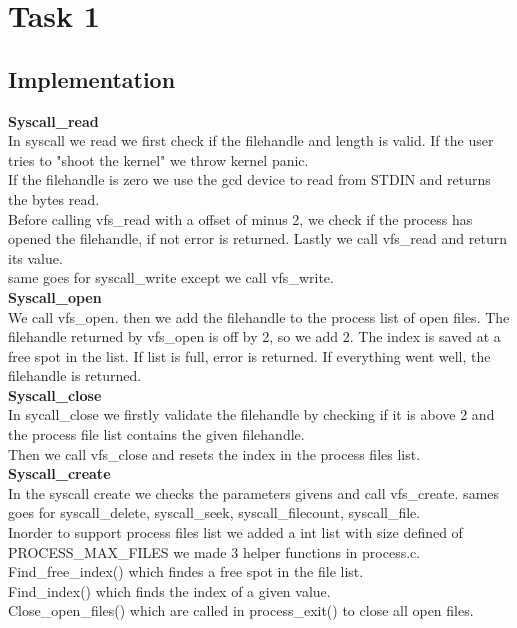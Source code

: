 \documentclass[12pt]{article}
\begin{document}
\section*{Task 1}
\subsection*{Implementation}
\textbf{Syscall\_read}\\
In syscall we read we first check if the filehandle and length is valid. If the user tries to "shoot the kernel" we throw kernel panic.\\
If the filehandle is zero we use the gcd device to read from STDIN and returns the bytes read.\\
Before calling vfs\_read with a offset of minus 2, we check if the process has opened the filehandle, if not error is returned. Lastly we call vfs\_read and return its value. \\
same goes for syscall\_write except we call vfs\_write.\\
\textbf{Syscall\_open}\\
We call vfs\_open. then we add the filehandle to the process list of open files. The filehandle returned by vfs\_open is off by 2, so we add 2. The index is saved at a free spot in the list. If list is full, error is returned. If everything went well, the filehandle is returned.\\
\textbf{Syscall\_close}\\
In sycall\_close we firstly validate the filehandle by checking if it is above 2 and the process file list contains the given filehandle. \\
Then we call vfs\_close and resets the index in the process files list.\\
\textbf{Syscall\_create}\\
In the syscall create we checks the parameters givens and call vfs\_create.
sames goes for syscall\_delete, syscall\_seek, syscall\_filecount, syscall\_file.\\

Inorder to support process files list we added a int list with size defined of PROCESS\_MAX\_FILES we made 3 helper functions in process.c.\\
Find\_free\_index() which findes a free spot in the file list.\\
Find\_index() which finds the index of a given value.\\
Close\_open\_files() which are called in process\_exit() to close all open files.
\end{document}
